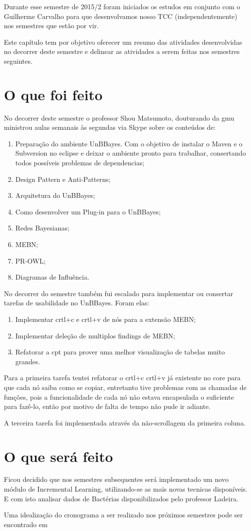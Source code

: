 Durante esse semestre de 2015/2 foram iniciados os estudos em conjunto com o Guilherme Carvalho para que desenvolvamos nosso TCC (independentemente) nos semestres que estão por vir.

Este capítulo tem por objetivo oferecer um resumo das atividades desenvolvidas no decorrer deste semestre e delinear as atividades a serem feitas nos semestres seguintes. 

\section{O que foi feito}
No decorrer deste semestre o professor Shou Matsumoto, douturando da \gls{gmu} ministrou aulas semanais às segundas via Skype sobre os conteúdos de: 

\begin{enumerate}
	\item Preparação do ambiente UnBBayes. Com o objetivo de instalar o Maven e o Subversion no eclipse e deixar o ambiente pronto para trabalhar, consertando todos possíveis problemas de dependencias;
	\item Design Pattern e Anti-Patterns;
	\item Arquitetura do UnBBayes;
	\item Como desenvolver um Plug-in para o UnBBayes;
	\item Redes Bayesianas;
	\item MEBN;
	\item PR-OWL;
	\item Diagramas de Influência.
\end{enumerate}

No decorrer do semestre também fui escalado para implementar ou consertar tarefas de usabilidade no UnBBayes. Foram elas:
\begin{enumerate}
	\item Implementar crtl+c e crtl+v de nós para a extensão MEBN;
	\item Implementar deleção de multiplos findings de MEBN;
	\item Refatorar a \gls{cpt} para prover uma melhor visualização de tabelas muito grandes.
\end{enumerate}

Para a primeira tarefa tentei refatorar o crtl+c crtl+v já existente no core para que cada nó saiba como se copiar, entretanto tive problemas com as chamadas de funções, pois a funcionalidade de cada nó não estava encapsulada o suficiente para fazê-lo, então por motivo de falta de tempo não pude ir adiante.

A terceira tarefa foi implementada através da não-scrollagem da primeira coluna.

\section{O que será feito}
Ficou decidido que nos semestres subsequentes será implementado um novo módulo de Incremental Learning, utilizando-se as mais novas tecnicas disponíveis. E com isto analisar dados de Bactérias disponibilizados pelo professor Ladeira.

Uma idealização do cronograma a ser realizado nos próximos semestres pode ser encontrado em \cite{cronograma}